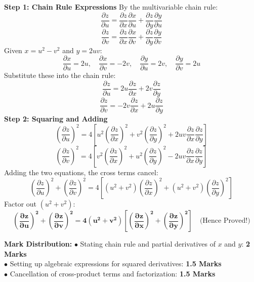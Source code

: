 \begin{solutionbox}
\textbf{Step 1: Chain Rule Expressions}
By the multivariable chain rule:
\[
\frac{\partial z}{\partial u} = \frac{\partial z}{\partial x} \frac{\partial x}{\partial u} + \frac{\partial z}{\partial y} \frac{\partial y}{\partial u}
\]
\[
\frac{\partial z}{\partial v} = \frac{\partial z}{\partial x} \frac{\partial x}{\partial v} + \frac{\partial z}{\partial y} \frac{\partial y}{\partial v}
\]
Given $x = u^2 - v^2$ and $y = 2uv$:
\[
\frac{\partial x}{\partial u} = 2u, \quad \frac{\partial x}{\partial v} = -2v, \quad \frac{\partial y}{\partial u} = 2v, \quad \frac{\partial y}{\partial v} = 2u
\]
Substitute these into the chain rule:
\[
\frac{\partial z}{\partial u} = 2u \frac{\partial z}{\partial x} + 2v \frac{\partial z}{\partial y}
\]
\[
\frac{\partial z}{\partial v} = -2v \frac{\partial z}{\partial x} + 2u \frac{\partial z}{\partial y}
\]
\textbf{Step 2: Squaring and Adding}
\[
\left(\frac{\partial z}{\partial u}\right)^2 = 4\left[ u^2 \left(\frac{\partial z}{\partial x}\right)^2 + v^2 \left(\frac{\partial z}{\partial y}\right)^2 + 2uv \frac{\partial z}{\partial x}\frac{\partial z}{\partial y} \right]
\]
\[
\left(\frac{\partial z}{\partial v}\right)^2 = 4\left[ v^2 \left(\frac{\partial z}{\partial x}\right)^2 + u^2 \left(\frac{\partial z}{\partial y}\right)^2 - 2uv \frac{\partial z}{\partial x}\frac{\partial z}{\partial y} \right]
\]
Adding the two equations, the cross terms cancel:
\[
\left(\frac{\partial z}{\partial u}\right)^2 + \left(\frac{\partial z}{\partial v}\right)^2 = 4\left[ (u^2 + v^2)\left(\frac{\partial z}{\partial x}\right)^2 + (u^2 + v^2)\left(\frac{\partial z}{\partial y}\right)^2 \right]
\]
Factor out $(u^2 + v^2)$:
\[
\mathbf{\left(\frac{\partial z}{\partial u}\right)^2 + \left(\frac{\partial z}{\partial v}\right)^2 = 4(u^2 + v^2)\left[ \left(\frac{\partial z}{\partial x}\right)^2 + \left(\frac{\partial z}{\partial y}\right)^2 \right]} \quad \text{(Hence Proved!)}
\]

\begin{markingrubric}
\textbf{Mark Distribution:}
$\bullet$ Stating chain rule and partial derivatives of $x$ and $y$: \textbf{2 Marks}\\
$\bullet$ Setting up algebraic expressions for squared derivatives: \textbf{1.5 Marks}\\
$\bullet$ Cancellation of cross-product terms and factorization: \textbf{1.5 Marks}
\end{markingrubric}
\end{solutionbox}


